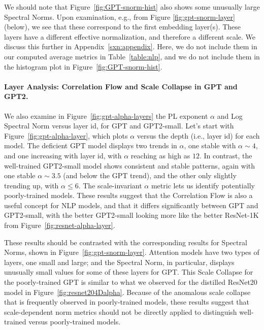 We should note that Figure~\ref{fig:GPT-snorm-hist} also shows some unusually large Spectral Norms.
Upon examination, e.g., from Figure \ref{fig:gpt-snorm-layer} (below), we see that these correspond to the first embedding layer(s).
These layers have a different effective normalization, and therefore a different scale.
We discuss this further in Appendix~\ref{sxn:appendix}.
Here, we do not include them in our computed average metrics in Table~\ref{table:nlp}, and we do not include them in the histogram plot in Figure~\ref{fig:GPT-snorm-hist}.



\vspace{-1mm}
\paragraph{Layer Analysis: Correlation Flow and Scale Collapse in GPT and GPT2.} 

We also examine in Figure~\ref{fig:gpt-alpha-layers} the PL exponent $\alpha$ and Log Spectral Norm versus layer id, for GPT and GPT2-small.
Let's start with Figure~\ref{fig:gpt-alpha-layer}, which plots $\alpha$ versus the depth (i.e., layer id) for each model.
The deficient GPT model displays two trends in $\alpha$, one stable with $\alpha\sim 4$, and one increasing with layer id, with $\alpha$ reaching as high as $12$.
In contrast, the well-trained GPT2-small model shows consistent and stable patterns, again with one stable $\alpha\sim 3.5$ (and below the GPT trend), and the other only slightly trending up, with $\alpha\le 6$. 
The scale-invariant $\alpha$ metric lets us identify potentially poorly-trained models.
These results suggest that the Correlation Flow is also a useful concept for NLP models, and that it differs significantly between GPT and GPT2-small, with the better GPT2-small looking more like the better ResNet-1K from Figure~\ref{fig:resnet-alpha-layer}.

These results should be contrasted with the corresponding results for Spectral Norms, shown in Figure~\ref{fig:gpt-snorm-layer}.
Attention models have two types of layers, one small and large; and the Spectral Norm, in particular, displays unusually small values for some of these layers for GPT.
This Scale Collapse for the poorly-trained GPT is similar to what we observed for the distilled ResNet20 model in Figure~\ref{fig:resnet204Dalpha}.
Because of the anomalous scale collapse that is frequently observed in poorly-trained models, these results suggest that scale-dependent norm metrics should not be directly applied to distinguish well-trained versus poorly-trained models. 


